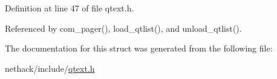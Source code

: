 Definition at line 47 of file qtext.\+h.



Referenced by com\+\_\+pager(), load\+\_\+qtlist(), and unload\+\_\+qtlist().



The documentation for this struct was generated from the following file\+:\begin{DoxyCompactItemize}
\item 
nethack/include/\hyperlink{qtext_8h}{qtext.\+h}\end{DoxyCompactItemize}
